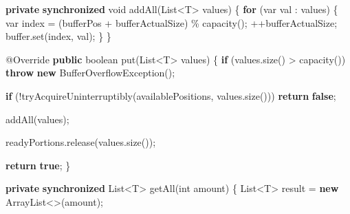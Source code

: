 \documentclass[11pt]{article}
\newenvironment{Shaded}{}{}
\newcommand{\KeywordTok}[1]{\textcolor[rgb]{0.00,0.44,0.13}{\textbf{{#1}}}}
\newcommand{\DataTypeTok}[1]{\textcolor[rgb]{0.56,0.13,0.00}{{#1}}}
\newcommand{\FunctionTok}[1]{\textcolor[rgb]{0.02,0.16,0.49}{{#1}}}
\newcommand{\NormalTok}[1]{{#1}}
\newcommand{\ControlFlowTok}[1]{\textcolor[rgb]{0.00,0.44,0.13}{\textbf{{#1}}}}
\newcommand{\OperatorTok}[1]{\textcolor[rgb]{0.40,0.40,0.40}{{#1}}}
\newcommand{\BuiltInTok}[1]{{#1}}
\newcommand{\AttributeTok}[1]{\textcolor[rgb]{0.49,0.56,0.16}{{#1}}}
\begin{document}
\begin{Shaded}
\begin{Highlighting}[]
    \KeywordTok{private} \KeywordTok{synchronized} \DataTypeTok{void} \FunctionTok{addAll}\OperatorTok{(}\BuiltInTok{List}\OperatorTok{\textless{}}\NormalTok{T}\OperatorTok{\textgreater{}}\NormalTok{ values}\OperatorTok{)} \OperatorTok{\{}
        \ControlFlowTok{for} \OperatorTok{(}\DataTypeTok{var}\NormalTok{ val }\OperatorTok{:}\NormalTok{ values}\OperatorTok{)} \OperatorTok{\{}
            \DataTypeTok{var}\NormalTok{ index }\OperatorTok{=} \OperatorTok{(}\NormalTok{bufferPos }\OperatorTok{+}\NormalTok{ bufferActualSize}\OperatorTok{)} \OperatorTok{\%} \FunctionTok{capacity}\OperatorTok{();}
            \OperatorTok{++}\NormalTok{bufferActualSize}\OperatorTok{;}
\NormalTok{            buffer}\OperatorTok{.}\FunctionTok{set}\OperatorTok{(}\NormalTok{index}\OperatorTok{,}\NormalTok{ val}\OperatorTok{);}
        \OperatorTok{\}}
    \OperatorTok{\}}

    \AttributeTok{@Override}
    \KeywordTok{public} \DataTypeTok{boolean} \FunctionTok{put}\OperatorTok{(}\BuiltInTok{List}\OperatorTok{\textless{}}\NormalTok{T}\OperatorTok{\textgreater{}}\NormalTok{ values}\OperatorTok{)} \OperatorTok{\{}
        \ControlFlowTok{if} \OperatorTok{(}\NormalTok{values}\OperatorTok{.}\FunctionTok{size}\OperatorTok{()} \OperatorTok{\textgreater{}} \FunctionTok{capacity}\OperatorTok{())}
            \ControlFlowTok{throw} \KeywordTok{new} \BuiltInTok{BufferOverflowException}\OperatorTok{();}

        \ControlFlowTok{if} \OperatorTok{(!}\FunctionTok{tryAcquireUninterruptibly}\OperatorTok{(}\NormalTok{availablePositions}\OperatorTok{,}\NormalTok{ values}\OperatorTok{.}\FunctionTok{size}\OperatorTok{()))}
            \ControlFlowTok{return} \KeywordTok{false}\OperatorTok{;}

        \FunctionTok{addAll}\OperatorTok{(}\NormalTok{values}\OperatorTok{);}

\NormalTok{        readyPortions}\OperatorTok{.}\FunctionTok{release}\OperatorTok{(}\NormalTok{values}\OperatorTok{.}\FunctionTok{size}\OperatorTok{());}

        \ControlFlowTok{return} \KeywordTok{true}\OperatorTok{;}
    \OperatorTok{\}}

    \KeywordTok{private} \KeywordTok{synchronized} \BuiltInTok{List}\OperatorTok{\textless{}}\NormalTok{T}\OperatorTok{\textgreater{}} \FunctionTok{getAll}\OperatorTok{(}\DataTypeTok{int}\NormalTok{ amount}\OperatorTok{)} \OperatorTok{\{}
        \BuiltInTok{List}\OperatorTok{\textless{}}\NormalTok{T}\OperatorTok{\textgreater{}}\NormalTok{ result }\OperatorTok{=} \KeywordTok{new} \BuiltInTok{ArrayList}\OperatorTok{\textless{}\textgreater{}(}\NormalTok{amount}\OperatorTok{);}


\end{Highlighting}
\end{Shaded}
\end{document}
